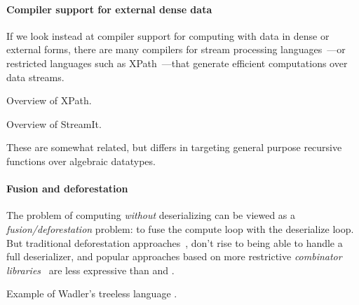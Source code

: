 \paragraph{Compiler support for external dense data}

If we look instead at compiler support for computing with data in dense or
external forms, there are many compilers for stream processing
languages~\cite{streamit,wavescript-nsdi}---or restricted languages such as
XPath~\cite{xpath-streams}---that generate efficient computations over data
streams.

Overview of XPath.

Overview of StreamIt.

These are somewhat related, but \ourcalc differs in targeting general
purpose recursive functions over algebraic datatypes.



%

\paragraph{Fusion and deforestation}

The problem of computing \emph{without} deserializing can be viewed as a
\emph{{fusion/deforestation}} problem: to fuse the compute loop with the
deserialize loop.  But traditional deforestation
approaches~\cite{wadler-deforestation}, don't rise to being able to handle
a full deserializer, and popular approaches based on more restrictive {\em combinator
  libraries}~\cite{stream-fusion} are less expressive than \lamadt and \ourcalc.

Example of Wadler's treeless language .


